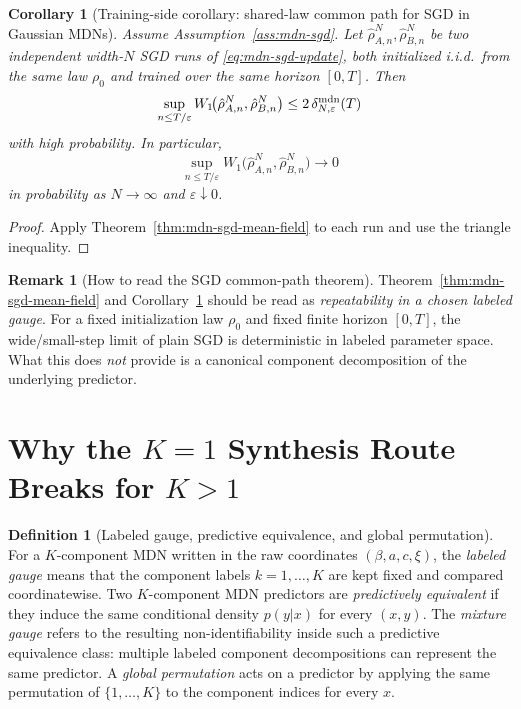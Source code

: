 \documentclass[11pt]{article}
\newtheorem{corollary}[theorem]{Corollary}
\theoremstyle{definition}
\newtheorem{definition}[theorem]{Definition}
\newtheorem{remark}[theorem]{Remark}
\begin{document}
\begin{corollary}[Training-side corollary: shared-law common path for SGD in Gaussian MDNs]
\label{cor:mdn-sgd-common-path}
Assume Assumption~\ref{ass:mdn-sgd}. Let $\hat\rho_{A,n}^N,\hat\rho_{B,n}^N$ be
two independent width-$N$ SGD runs of \eqref{eq:mdn-sgd-update}, both
initialized i.i.d.\ from the same law $\rho_0$ and trained over the same
horizon $[0,T]$. Then
\[
  \sup_{n\le T/\varepsilon}
  W_1\!\bigl(\hat\rho_{A,n}^N,\hat\rho_{B,n}^N\bigr)
  \le
  2\,\delta_{N,\varepsilon}^{\rm mdn}(T)
\]
with high probability. In particular,
\[
  \sup_{n\le T/\varepsilon}
  W_1\!\bigl(\hat\rho_{A,n}^N,\hat\rho_{B,n}^N\bigr)\to 0
\]
in probability as $N\to\infty$ and $\varepsilon\downarrow 0$.
\end{corollary}

\begin{proof}
Apply Theorem~\ref{thm:mdn-sgd-mean-field} to each run and use the triangle
inequality.
\end{proof}

\begin{remark}[How to read the SGD common-path theorem]
Theorem~\ref{thm:mdn-sgd-mean-field} and
Corollary~\ref{cor:mdn-sgd-common-path} should be read as \emph{repeatability in
a chosen labeled gauge}. For a fixed initialization law $\rho_0$ and fixed
finite horizon $[0,T]$, the wide/small-step limit of plain SGD is
deterministic in labeled parameter space. What this does \emph{not} provide is
a canonical component decomposition of the underlying predictor.
\end{remark}

\section{Why the \texorpdfstring{$K=1$}{K=1} Synthesis Route Breaks for \texorpdfstring{$K>1$}{K>1}}

\begin{definition}[Labeled gauge, predictive equivalence, and global permutation]
For a $K$-component MDN written in the raw coordinates
$(\beta,a,c,\xi)$, the \emph{labeled gauge} means that the component labels
$k=1,\dots,K$ are kept fixed and compared coordinatewise. Two $K$-component
MDN predictors are \emph{predictively equivalent} if they induce the same
conditional density $p(y|x)$ for every $(x,y)$. The \emph{mixture gauge}
refers to the resulting non-identifiability inside such a predictive
equivalence class: multiple labeled component decompositions can represent the
same predictor. A \emph{global permutation} acts on a predictor by applying the
same permutation of $\{1,\dots,K\}$ to the component indices for every $x$.
\end{definition}
\end{document}

